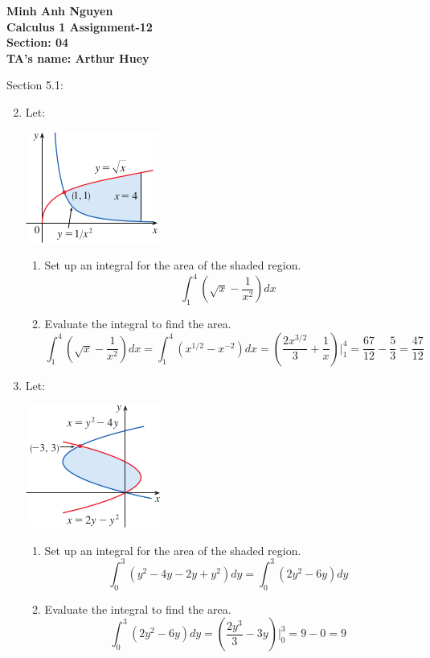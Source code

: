 \documentclass[12pt]{article}
\begin{document}
\textbf{Minh Anh Nguyen }\\
\textbf{Calculus 1 Assignment-12}\\
\textbf{Section: 04}\\
\textbf{TA's name: Arthur Huey}

\hrulefill

Section 5.1:

\begin{enumerate}
\setcounter{enumi}{1}
    \item Let:
    \begin{center}
        \includegraphics{img/img-0.png}
    \end{center}
    \begin{enumerate}
        \item Set up an integral for the area of the shaded region.
        \[\int_{1}^{4} (\sqrt{x} - \frac{1}{x^2})dx\]
        \item Evaluate the integral to find the area.
        \[\int_{1}^{4} (\sqrt{x} - \frac{1}{x^2})dx = \int_{1}^{4} (x^{1/2} - x^{-2})dx = (\frac{2x^{3/2}}{3} + \frac{1}{x})|_{1}^{4} = \frac{67}{12} - \frac{5}{3} = \frac{47}{12}\]
    \end{enumerate}

\setcounter{enumi}{3}
    \item Let:
    \begin{center}
        \includegraphics{img/img-1.png}
    \end{center}
    \begin{enumerate}
        \item Set up an integral for the area of the shaded region.
        \[\int_{0}^{3}(y^2-4y-2y+y^2)dy = \int_{0}^{3}(2y^2-6y)dy \]
        \item Evaluate the integral to find the area.
        \[\int_{0}^{3}(2y^2-6y)dy = (\frac{2y^3}{3}-3y)|_{0}^{3} = 9 - 0 = 9\]
    \end{enumerate}


\end{enumerate}
\end{document}
